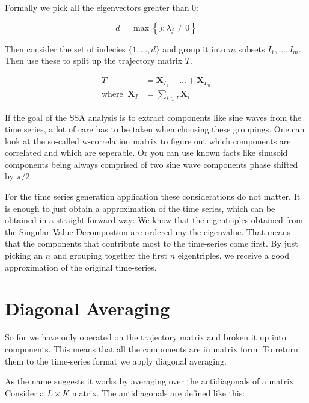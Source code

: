 Formally we pick all the eigenvectors greater than 0:

\begin{equation}
  d=\max \left\{j: \lambda_{j} \neq 0\right\} 
\end{equation}

Then consider the set of indecies $\{1, \ldots, d\}$ and group it into $m$ subsets $I_1, \ldots, I_m$. Then use these to split up the trajectory matrix $T$. 

\begin{equation}
   \begin{aligned}
      T&=\mathbf{X}_{I_{1}}+\ldots+\mathbf{X}_{I_{m}} \\
      \text{where} \;\; \mathbf{X}_{I}&=\sum_{i \in I} \mathbf{X}_{i}
   \end{aligned}
\end{equation}
  
If the goal of the SSA analysis is to extract components like sine waves from the time series, a lot of care has to be taken when choosing these groupings. One can look at the so-called w-correlation matrix to figure out which components are correlated and which are seperable. Or you can use known facts like sinusoid components being always comprised of two sine wave components phase shifted by $\pi/2$. 

For the time series generation application these considerations do not matter. It is enough to just obtain a approximation of the time series, which can be obtained in a straight forward way: We know that the eigentriples obtained from the Singular Value Decompostion are ordered my the eigenvalue. That means that the components that contribute most to the time-series come first. By just picking an $n$ and grouping together the first $n$ eigentriples, we receive a good approximation of the original time-series. 

\section{Diagonal Averaging}

So for we have only operated on the trajectory matrix and broken it up into components. This means that all the components are in matrix form. To return them to the time-series format we apply diagonal averaging. 

As the name suggests it works by averaging over the antidiagonals of a matrix. Consider a $L\times K$ matrix. The antidiagonals are defined like this: 

